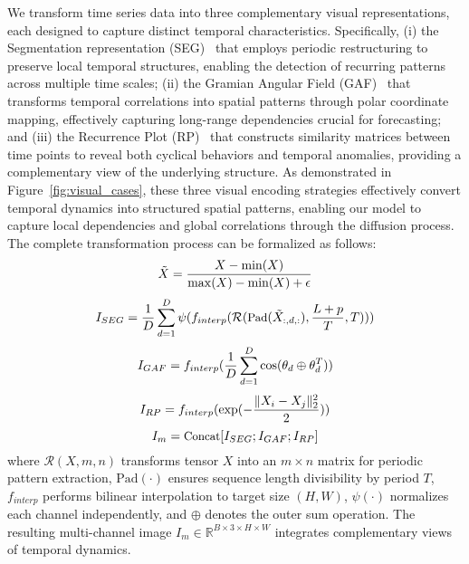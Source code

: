 We transform time series data into three complementary visual representations, each designed to capture distinct temporal characteristics. Specifically, (i) the Segmentation representation (SEG)~\cite{chen2024visionts} that employs periodic restructuring to preserve local temporal structures, enabling the detection of recurring patterns across multiple time scales; (ii) the Gramian Angular Field (GAF)~\cite{zheng2014time,wang2015encoding} that transforms temporal correlations into spatial patterns through polar coordinate mapping, effectively capturing long-range dependencies crucial for forecasting; and (iii) the Recurrence Plot (RP)~\cite{eckmann1995recurrence,marwan2007recurrence} that constructs similarity matrices between time points to reveal both cyclical behaviors and temporal anomalies, providing a complementary view of the underlying structure. As demonstrated in Figure~\ref{fig:visual_cases}, these three visual encoding strategies effectively convert temporal dynamics into structured spatial patterns, enabling our model to capture local dependencies and global correlations through the diffusion process. The complete transformation process can be formalized as follows:
\begin{equation}
\small
\tilde{X} = \frac{X - \min(X)}{\max(X) - \min(X) + \epsilon}
\end{equation}
\begin{equation}
\small
I_{SEG} = \frac{1}{D}\sum_{d=1}^D \psi(f_{interp}(\mathcal{R}(\text{Pad}(\tilde{X}_{:,d,:}), \frac{L+p}{T}, T)))
\end{equation}
\begin{equation}
\small
I_{GAF} = f_{interp}(\frac{1}{D}\sum_{d=1}^D \cos(\theta_d \oplus \theta_d^T))
\end{equation}
\begin{equation}
\small
I_{RP} = f_{interp}(\exp(-\frac{\|X_i - X_j\|_2^2}{2}))
\end{equation}
\begin{equation} 
\small
I_m = \text{Concat}[I_{SEG}; I_{GAF}; I_{RP}]
\end{equation}
where $\mathcal{R}(X,m,n)$ transforms tensor $X$ into an $m \times n$ matrix for periodic pattern extraction, $\text{Pad}(\cdot)$ ensures sequence length divisibility by period $T$, $f_{interp}$ performs bilinear interpolation to target size $(H,W)$, $\psi(\cdot)$ normalizes each channel independently, and $\oplus$ denotes the outer sum operation. The resulting multi-channel image $I_m\in \mathbb{R}^{B \times 3 \times H \times W}$ integrates complementary views of temporal dynamics.

